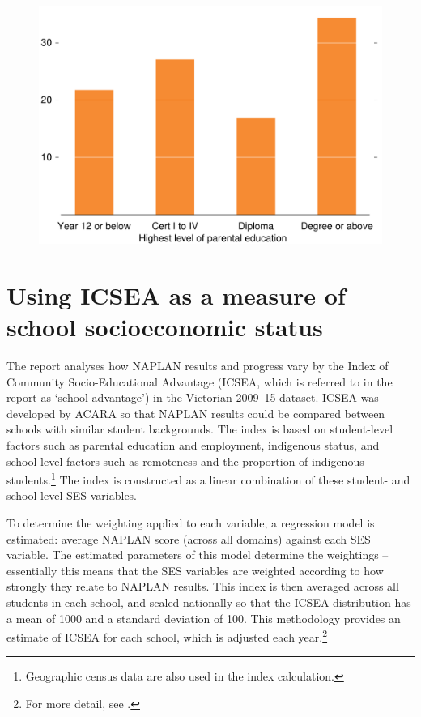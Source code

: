 \begin{figure}[t]
 \includegraphics[width=\columnwidth]{atlas/Parental_ed.pdf}\label{fig:parental_ed}

\end{figure}

\section{Using ICSEA as a measure of school socioeconomic status} \label{sec:icsea}

The report analyses how NAPLAN results and progress vary by the Index of Community Socio-Educational Advantage (ICSEA, which is referred to in the report as `school advantage') in the Victorian 2009--15 dataset. ICSEA was developed by ACARA so that NAPLAN results could be compared between schools with similar student backgrounds. The index is based on student-level factors such as parental education and employment, indigenous status, and school-level factors such as remoteness and the proportion of indigenous students.\footnote{Geographic census data are also used in the index calculation.} The index is constructed as a linear combination of these student- and school-level SES variables.

To determine the weighting applied to each variable, a regression model is estimated: average NAPLAN score (across all domains) against each SES variable. The estimated parameters of this model determine the weightings -- essentially this means that the SES variables are weighted according to how strongly they relate to NAPLAN results. This index is then averaged across all students in each school, and scaled nationally so that the ICSEA distribution has a mean of 1000 and a standard deviation of 100. This methodology provides an estimate of ICSEA for each school, which is adjusted each year.\footnote{For more detail, see \textcite{acara2014a}.}

